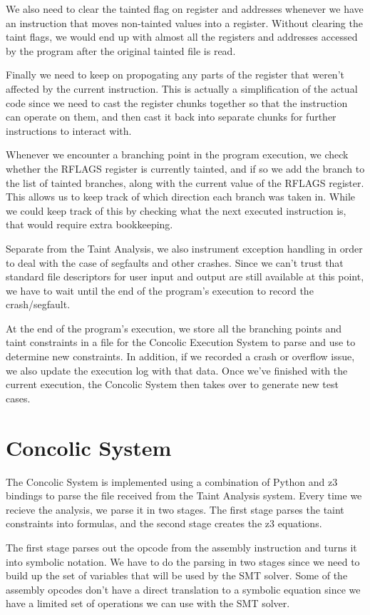 We also need to clear the tainted flag on register and addresses whenever we
have an instruction that moves non-tainted values into a register. Without
clearing the taint flags, we would end up with almost all the registers and
addresses accessed by the program after the original tainted file is read.

Finally we need to keep on propogating any parts of the register that weren't
affected by the current instruction. This is actually a simplification of the
actual code since we need to cast the register chunks together so that the
instruction can operate on them, and then cast it back into separate chunks for
further instructions to interact with.

Whenever we encounter a branching point in the program execution, we check
whether the RFLAGS register is currently tainted, and if so we add the branch to
the list of tainted branches, along with the current value of the RFLAGS
register. This allows us to keep track of which direction each branch was taken
in. While we could keep track of this by checking what the next executed
instruction is, that would require extra bookkeeping.

Separate from the Taint Analysis, we also instrument exception handling in order
to deal with the case of segfaults and other crashes. Since we can't trust that
standard file descriptors for user input and output are still available at this
point, we have to wait until the end of the program's execution to record the
crash/segfault.

At the end of the program's execution, we store all the branching points and
taint constraints in a file for the Concolic Execution System to parse and use
to determine new constraints. In addition, if we recorded a crash or overflow
issue, we also update the execution log with that data. Once we've finished with
the current execution, the Concolic System then takes over to generate new test
cases.

\section{Concolic System}
The Concolic System is implemented using a combination of Python and z3 bindings
to parse the file received from the Taint Analysis system. Every time we recieve
the analysis, we parse it in two stages. The first stage parses the taint
constraints into formulas, and the second stage creates the z3 equations.

The first stage parses out the opcode from the assembly instruction and turns it
into symbolic notation. We have to do the parsing in two stages since we need to
build up the set of variables that will be used by the SMT solver. Some of the
assembly opcodes don't have a direct translation to a symbolic equation since we
have a limited set of operations we can use with the SMT solver.

